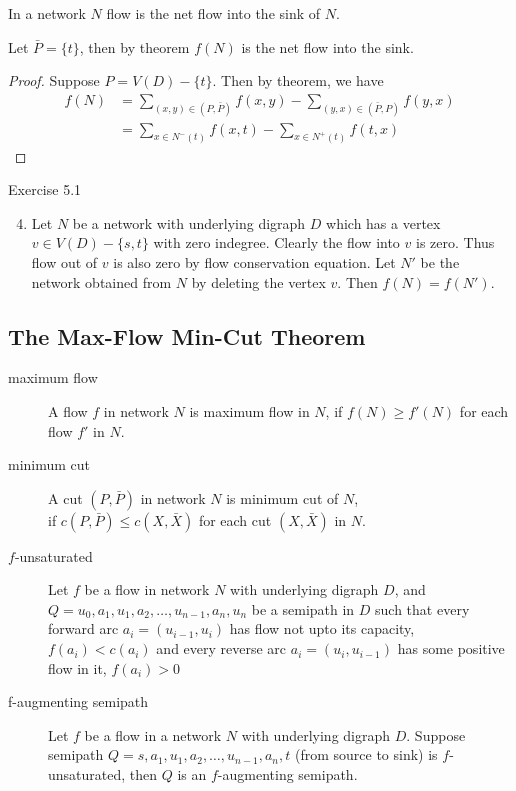 \begin{corollary}
	In a network $N$ flow is the net flow into the sink of $N$.
\end{corollary}
\begin{synopsis}
	Let $\bar{P} = \{ t \}$, then by theorem $f(N)$ is the net flow into the sink.
\end{synopsis}
\begin{proof}
	Suppose $P = V(D)-\{t\}$.
	Then by theorem, we have
	\begin{align*}
		f(N) 	& = \sum_{(x,y) \in (P,\bar{P})} f(x,y) - \sum_{(y,x) \in (\bar{P},P)} f(y,x) \\
			& = \sum_{x \in N^-(t)} f(x,t) - \sum_{x \in N^+(t)} f(t,x)
	\end{align*}
\end{proof}

\begin{remark}Exercise 5.1
	\begin{enumerate}
		\setcounter{enumi}{3}
		\item Let $N$ be a network with underlying digraph $D$ which has a vertex $v \in V(D) - \{ s,t \}$ with zero indegree.
			Clearly the flow into $v$ is zero.
			Thus flow out of $v$ is also zero by flow conservation equation.
			Let $N'$ be the network obtained from $N$ by deleting the vertex $v$.
			Then $f(N) = f(N')$.
	\end{enumerate}
\end{remark}

\subsection{The Max-Flow Min-Cut Theorem}
\begin{description}
	\item[maximum flow] A flow $f$ in network $N$ is maximum flow in $N$, if $f(N) \ge f'(N)$ for each flow $f'$ in $N$.
	\item[minimum cut] A cut $(P,\bar{P})$ in network $N$ is minimum cut of $N$,\\ if $c(P,\bar{P}) \le c(X,\bar{X})$ for each cut $(X,\bar{X})$ in $N$.
	\item[$f$-unsaturated] Let $f$ be a flow in network $N$ with underlying digraph $D$, and $Q = u_0,a_1,u_1,a_2,\dots,u_{n-1},a_n,u_n$ be a semipath in $D$ such that every forward arc $a_i = (u_{i-1},u_i)$ has flow not upto its capacity, $f(a_i) < c(a_i)$ and every reverse arc $a_i = (u_i,u_{i-1})$ has some positive flow in it, $f(a_i) > 0$
	\item[f-augmenting semipath] Let $f$ be a flow in a network $N$ with underlying digraph $D$.
		Suppose semipath $Q = s,a_1,u_1,a_2,\dots,u_{n-1},a_n,t$ (from source to sink) is $f$-unsaturated, then $Q$ is an $f$-augmenting semipath.
\end{description}


